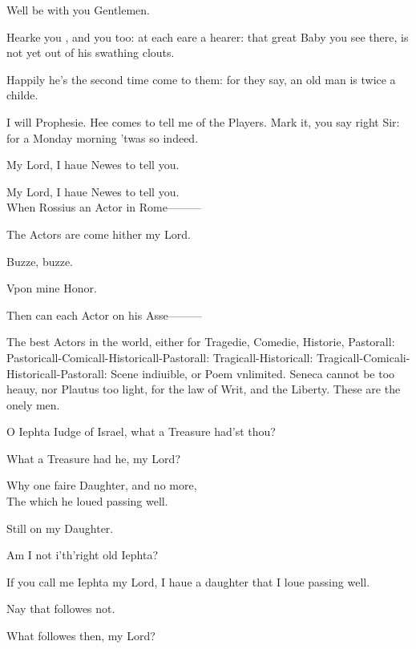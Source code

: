 \documentclass[a5paper,DIV=calc,11pt]{scrbook}
\begin{document}
\begin{drama*}
    
    \polspeaks Well be with you Gentlemen.
    
    \hamspeaks Hearke you \guil, and you too: at each eare a hearer: that great Baby you see there, is not yet out of his swathing clouts.
    
    \rosinspeaks Happily he's the second time come to them: for they say, an old man is twice a childe.
    
    \hamspeaks I will Prophesie. Hee comes to tell me of the Players. Mark it, you say right Sir: for a Monday morning 'twas so indeed.
    
    \polspeaks My Lord, I haue Newes to tell you.
    
    \hamspeaks My Lord, I haue Newes to tell you.\\
    When Rossius an Actor in Rome———
    
    \polspeaks The Actors are come hither my Lord.
    
    \hamspeaks Buzze, buzze.
    
    \polspeaks Vpon mine Honor.
    
    \hamspeaks Then can each Actor on his Asse———
    
    \polspeaks The best Actors in the world, either for Tragedie, Comedie, Historie, Pastorall: Pastoricall-Comicall-Historicall-Pastorall: Tragicall-Historicall: Tragicall-Comicali-Historicall-Pastorall: Scene indiuible, or Poem vnlimited. Seneca cannot be too heauy, nor Plautus too light, for the law of Writ, and the Liberty. These are the onely men.
    
    \hamspeaks O Iephta Iudge of Israel, what a Treasure had'st thou?
    
    \polspeaks What a Treasure had he, my Lord?
    
    \hamspeaks Why one faire Daughter, and no more,\\
    The which he loued passing well.
    
    \polspeaks Still on my Daughter.
    
    \hamspeaks Am I not i'th'right old Iephta?
    
    \polspeaks If you call me Iephta my Lord, I haue a daughter that I loue passing well.
    
    \hamspeaks Nay that followes not.
    
    \polspeaks What followes then, my Lord?
    

\end{drama*}
\end{document}
